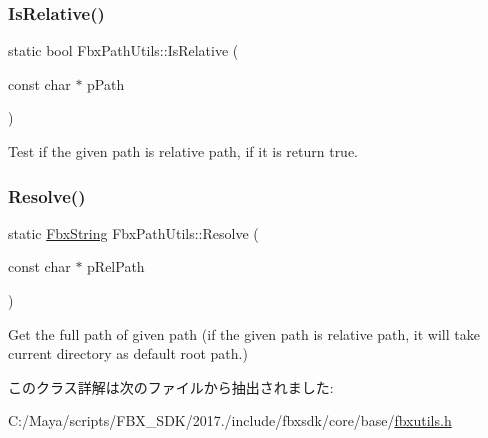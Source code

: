 \subsubsection{\texorpdfstring{Is\+Relative()}{IsRelative()}}
{\footnotesize\ttfamily static bool Fbx\+Path\+Utils\+::\+Is\+Relative (\begin{DoxyParamCaption}\item[{const char $\ast$}]{p\+Path }\end{DoxyParamCaption})\hspace{0.3cm}{\ttfamily [static]}}



Test if the given path is relative path, if it is return true. 

\mbox{\label{class_fbx_path_utils_a5adc2b4d7bed904ba22f3613f9bb729a}} 
\subsubsection{\texorpdfstring{Resolve()}{Resolve()}}
{\footnotesize\ttfamily static \hyperlink{class_fbx_string}{Fbx\+String} Fbx\+Path\+Utils\+::\+Resolve (\begin{DoxyParamCaption}\item[{const char $\ast$}]{p\+Rel\+Path }\end{DoxyParamCaption})\hspace{0.3cm}{\ttfamily [static]}}

Get the full path of given path (if the given path is relative path, it will take current directory as default root path.) 

このクラス詳解は次のファイルから抽出されました\+:\begin{DoxyCompactItemize}
\item 
C\+:/\+Maya/scripts/\+F\+B\+X\+\_\+\+S\+D\+K/2017./include/fbxsdk/core/base/\hyperlink{fbxutils_8h}{fbxutils.\+h}\end{DoxyCompactItemize}
